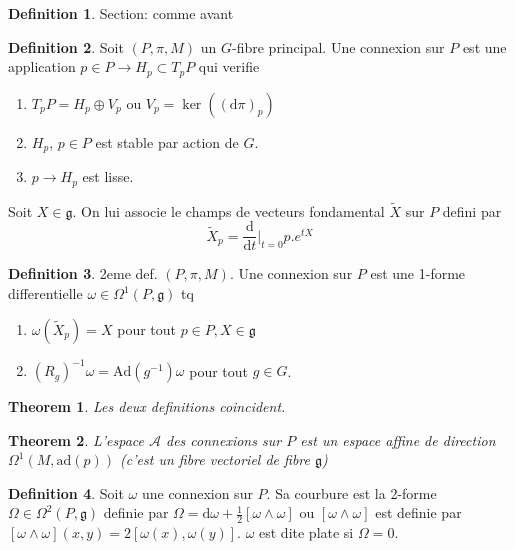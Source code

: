 \documentclass[a4paper]{report}
\newtheorem{theorem}{Theorem}[section]
\theoremstyle{definition}
\newtheorem{definition}{Definition}[section]
\theoremstyle{remark}
\begin{document}
\begin{definition}
    Section: comme avant
\end{definition}

\begin{definition}
    Soit $(P, \pi, M)$ un $G$-fibre principal. Une connexion sur $P$ est une application $p\in P \rightarrow H_p \subset T_p P$ qui verifie 
    \begin{enumerate}
        \item $T_p P = H_p \oplus V_p$ ou $V_p = \ker ((\text{d}\pi)_p)$
        \item $H_p$, $p \in P$ est stable par action de $G$. 
        \item $p \rightarrow H_p$ est lisse. 
    \end{enumerate}
\end{definition}

Soit $X\in \mathfrak g$. On lui associe le champs de vecteurs fondamental $\tilde X$ sur $P$ defini par 
\begin{equation}
    \tilde X_p = \frac{\text{d}}{\text{d}t}\Big|_{t=0} p. e^{tX}
\end{equation}

\begin{definition}
    2eme def. $(P, \pi, M)$. Une connexion sur $P$ est une 1-forme differentielle $\omega \in \Omega^1 (P, \mathfrak{g})$ tq 
    \begin{enumerate}
        \item $\omega(\tilde X_p) = X$ pour tout $p\in P, X \in \mathfrak{g}$
        \item $(R_g)^{-1} \omega = \text{Ad}(g^{-1})\omega$ pour tout $g\in G$. 
    \end{enumerate}
\end{definition}

\begin{theorem}
    Les deux definitions coincident. 
\end{theorem}

\begin{theorem}
    L'espace $\mathcal A$ des connexions sur $P$ est un espace affine de direction $\Omega^1 (M, \text{ad}(p))$ (c'est un fibre vectoriel de fibre $\mathfrak{g}$)
\end{theorem}

\begin{definition}
    Soit $\omega$ une connexion sur $P$. Sa courbure est la 2-forme $\Omega \in \Omega^2 (P, \mathfrak{g})$ definie par $\Omega = \text{d}\omega + \frac{1}{2}[\omega \wedge \omega]$ ou $[\omega \wedge \omega]$ est definie par $[\omega \wedge \omega](x,y) = 2[\omega(x), \omega(y)]$. $\omega$ est dite plate si $\Omega = 0$. 
\end{definition}
\end{document}
